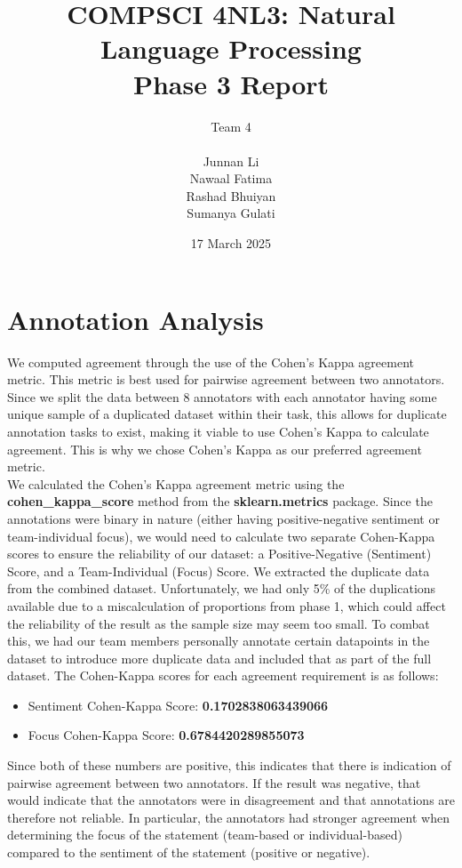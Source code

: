 \documentclass[titlepage]{article}
\title{COMPSCI 4NL3: Natural Language Processing\\
Phase 3 Report}
\author{Team 4\\
\\ Junnan Li
\\ Nawaal Fatima
\\ Rashad Bhuiyan
\\ Sumanya Gulati}
\date{17 March 2025}
\begin{document}
\begin{titlepage}
  \maketitle
\end{titlepage}

\newpage

\tableofcontents

\newpage

\section{Annotation Analysis}
We computed agreement through the use of the Cohen's Kappa agreement metric. This metric is best used for pairwise agreement between two annotators. 
Since we split the data between 8 annotators with each annotator having some unique sample of a duplicated dataset within their task, this allows for 
duplicate annotation tasks to exist, making it viable to use Cohen's Kappa to calculate agreement. This is why we chose Cohen's Kappa as our preferred 
agreement metric. \\ 
\newline
We calculated the Cohen's Kappa agreement metric using the \textbf{cohen\_kappa\_score} method from the \textbf{sklearn.metrics} package. 
Since the annotations were binary in nature (either having positive-negative sentiment or team-individual focus), we would need to calculate two
separate Cohen-Kappa scores to ensure the reliability of our dataset: a Positive-Negative (Sentiment) Score, and a Team-Individual (Focus) Score.
We extracted the duplicate data from the combined dataset. Unfortunately, we had only 5\% of the duplications available due to a miscalculation of
proportions from phase 1, which could affect the reliability of the result as the sample size may seem too small. To combat this, we had our team 
members personally annotate certain datapoints in the dataset to introduce more duplicate data and included that as part of the full dataset.
The Cohen-Kappa scores for each agreement requirement is as follows:
\begin{itemize}
  \item Sentiment Cohen-Kappa Score: \textbf{0.1702838063439066}
  \item Focus Cohen-Kappa Score: \textbf{0.6784420289855073}
\end{itemize}
Since both of these numbers are positive, this indicates that there is indication of pairwise agreement between two annotators. If the result
was negative, that would indicate that the annotators were in disagreement and that annotations are therefore not reliable. In particular, the
annotators had stronger agreement when determining the focus of the statement (team-based or individual-based) compared to the sentiment of the
statement (positive or negative).
\end{document}
